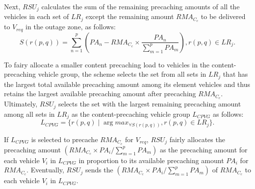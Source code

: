 \documentclass[sensors,aricle,accept,pdftex,moreauthors]{Definitions/mdpi}
\begin{document}
Next, $RSU_{j}$ calculates the sum of the remaining precaching amounts of all the vehicles in each set of $LR_{j}$ except the remaining amount $RMA_{C_{c}}$ to be delivered to $V_{req}$ in the outage zone, as follows:
\begin{equation}
    S(r(p,q))=\sum^{p}_{n=1}(PA_{n} - RMA_{C_{c}}\times\frac{PA_{n}}{\sum_{m=1}^{p}PA_{m}}), r(p,q)\in LR_{j}.
\end{equation}

To fairy allocate a smaller content precaching load to vehicles in the content-precaching vehicle group, the scheme selects the set from all sets in $LR_{j}$ that has the largest total available precaching amount among its element vehicles and thus retains the largest available precaching amount after precaching $RMA_{C_{c}}$.
Ultimately, $RSU_{j}$ selects the set with the largest remaining precaching amount among all sets in $LR_{j}$ as the content-precaching vehicle group $L_{CPVG}$ as follows:
\begin{equation}
    L_{CPVG}=\{r(p,q) \mid \arg max_{\forall S(r(p,q))}, r(p,q)\in LR_{j}\}.
\end{equation}

If $L_{CPVG}$ is selected to precache $RMA_{C_{c}}$ for $V_{req}$, $RSU_{j}$ fairly allocates the precaching amount $(RMA_{C_{c}}\times PA_{i} / \sum_{m=1}^{p}PA_{m})$ as the precaching amount for each vehicle $V_{i}$ in $L_{CPVG}$ in proportion to its available precaching amount $PA_{i}$ for $RMA_{C_{c}}$.
Eventually, $RSU_{j}$ sends the $(RMA_{C_{c}}\times PA_{i} / \sum_{m=1}^{p}PA_{m})$ of $RMA_{C_{c}}$ to each vehicle $V_{i}$ in $L_{CPVG}$.
\end{document}
